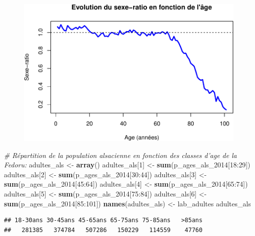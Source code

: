 \documentclass[]{article}
\newenvironment{Shaded}{\begin{snugshade}}{\end{snugshade}}
\newcommand{\KeywordTok}[1]{\textcolor[rgb]{0.13,0.29,0.53}{\textbf{{#1}}}}
\newcommand{\DecValTok}[1]{\textcolor[rgb]{0.00,0.00,0.81}{{#1}}}
\newcommand{\StringTok}[1]{\textcolor[rgb]{0.31,0.60,0.02}{{#1}}}
\newcommand{\CommentTok}[1]{\textcolor[rgb]{0.56,0.35,0.01}{\textit{{#1}}}}
\newcommand{\NormalTok}[1]{{#1}}
\begin{document}
\begin{figure}[htbp]
\centering
\includegraphics{age_files/figure-latex/pop_als-3.pdf}
\end{figure}

\begin{Shaded}
\begin{Highlighting}[]
\CommentTok{# Répartition de la population alsacienne en fonction des classes d'age de la Fedoru:}
\NormalTok{adultes_als <-}\StringTok{ }\KeywordTok{array}\NormalTok{()}
\NormalTok{adultes_als[}\DecValTok{1}\NormalTok{] <-}\StringTok{ }\KeywordTok{sum}\NormalTok{(p_ages_als_2014[}\DecValTok{18}\NormalTok{:}\DecValTok{29}\NormalTok{])}
\NormalTok{adultes_als[}\DecValTok{2}\NormalTok{] <-}\StringTok{ }\KeywordTok{sum}\NormalTok{(p_ages_als_2014[}\DecValTok{30}\NormalTok{:}\DecValTok{44}\NormalTok{])}
\NormalTok{adultes_als[}\DecValTok{3}\NormalTok{] <-}\StringTok{ }\KeywordTok{sum}\NormalTok{(p_ages_als_2014[}\DecValTok{45}\NormalTok{:}\DecValTok{64}\NormalTok{])}
\NormalTok{adultes_als[}\DecValTok{4}\NormalTok{] <-}\StringTok{ }\KeywordTok{sum}\NormalTok{(p_ages_als_2014[}\DecValTok{65}\NormalTok{:}\DecValTok{74}\NormalTok{])}
\NormalTok{adultes_als[}\DecValTok{5}\NormalTok{] <-}\StringTok{ }\KeywordTok{sum}\NormalTok{(p_ages_als_2014[}\DecValTok{75}\NormalTok{:}\DecValTok{84}\NormalTok{])}
\NormalTok{adultes_als[}\DecValTok{6}\NormalTok{] <-}\StringTok{ }\KeywordTok{sum}\NormalTok{(p_ages_als_2014[}\DecValTok{85}\NormalTok{:}\DecValTok{101}\NormalTok{])}
\KeywordTok{names}\NormalTok{(adultes_als) <-}\StringTok{ }\NormalTok{lab_adultes}
\NormalTok{adultes_als}
\end{Highlighting}
\end{Shaded}

\begin{verbatim}
## 18-30ans 30-45ans 45-65ans 65-75ans 75-85ans   >85ans 
##   281385   374784   507286   150229   114559    47760
\end{verbatim}
\end{document}
